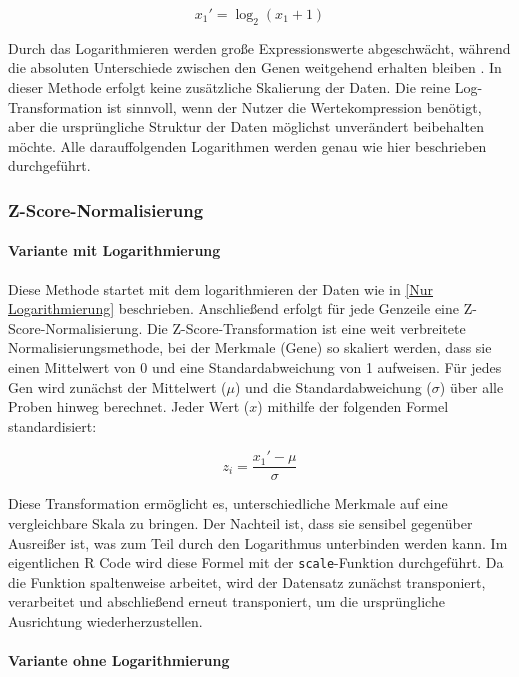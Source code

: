 \documentclass[12pt]{article}
\begin{document}
\[
x_1'=\log_2(x_1+1)
\]

Durch das Logarithmieren werden große Expressionswerte abgeschwächt, während die absoluten Unterschiede zwischen den Genen weitgehend erhalten bleiben \cite{Durbin2002VST}. In dieser Methode erfolgt keine zusätzliche Skalierung der Daten. Die reine Log-Transformation ist sinnvoll, wenn der Nutzer die Wertekompression benötigt, aber die ursprüngliche Struktur der Daten möglichst unverändert beibehalten möchte. Alle darauffolgenden Logarithmen werden genau wie hier beschrieben durchgeführt.


\subsubsection{Z-Score-Normalisierung}
\label{Z-Score-Normalisierung}

\paragraph{Variante mit Logarithmierung}

Diese Methode startet mit dem logarithmieren der Daten wie in \ref{Nur Logarithmierung} beschrieben.
Anschließend erfolgt für jede Genzeile eine Z-Score-Normalisierung. Die Z-Score-Transformation ist eine weit verbreitete Normalisierungsmethode, bei der Merkmale (Gene) so skaliert werden, dass sie einen Mittelwert von 0 und eine Standardabweichung von 1 aufweisen. Für jedes Gen wird zunächst der Mittelwert ($\mu$) und die Standardabweichung ($\sigma$) über alle Proben hinweg berechnet\cite{Deng2025}. Jeder Wert ($x$) mithilfe der folgenden Formel standardisiert:

\[
z_i=\frac{x_1'-\mu}{\sigma}
\]

Diese Transformation ermöglicht es, unterschiedliche Merkmale auf eine vergleichbare Skala zu bringen\cite{Deng2025}. Der Nachteil ist, dass sie sensibel gegenüber Ausreißer ist, was zum Teil durch den Logarithmus unterbinden werden kann. Im eigentlichen R Code wird diese Formel mit der \texttt{scale}-Funktion durchgeführt. Da die Funktion spaltenweise arbeitet, wird der Datensatz zunächst transponiert, verarbeitet und abschließend erneut transponiert, um die ursprüngliche Ausrichtung wiederherzustellen.

\paragraph{Variante ohne Logarithmierung}
\end{document}
